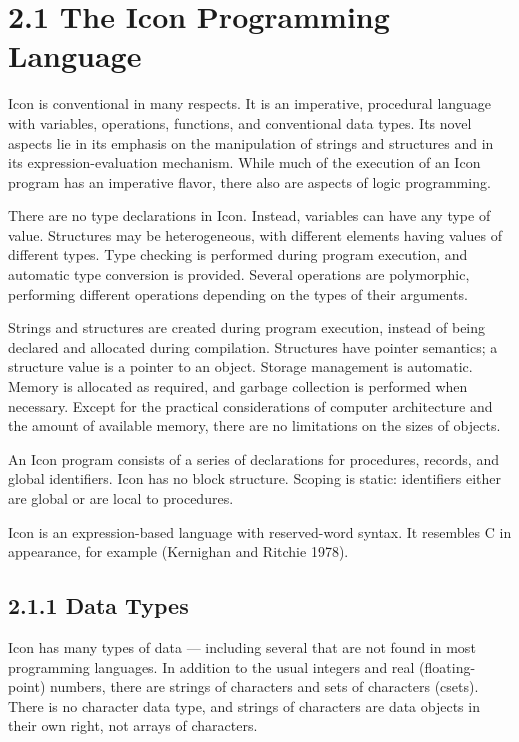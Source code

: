 \section[2.1 The Icon Programming Language]{2.1 The Icon Programming Language}

Icon is conventional in many respects. It is an imperative, procedural
language with variables, operations, functions, and conventional data
types. Its novel aspects lie in its emphasis on the manipulation of
strings and structures and in its expression-evaluation
mechanism. While much of the execution of an Icon program has an
imperative flavor, there also are aspects of logic programming.

There are no type declarations in Icon. Instead, variables can have
any type of value. Structures may be heterogeneous, with different
elements having values of different types. Type checking is performed
during program execution, and automatic type conversion is
provided. Several operations are polymorphic, performing different
operations depending on the types of their arguments.

Strings and structures are created during program execution, instead
of being declared and allocated during compilation.  Structures have
pointer semantics; a structure value is a pointer to an object.
Storage management is automatic. Memory is allocated as required, and
garbage collection is performed when necessary. Except for the
practical considerations of computer architecture and the amount of
available memory, there are no limitations on the sizes of objects.

An Icon program consists of a series of declarations for procedures,
records, and global identifiers. Icon has no block structure. Scoping
is static: identifiers either are global or are local to procedures.

Icon is an expression-based language with reserved-word syntax. It
resembles C in appearance, for example (Kernighan and Ritchie 1978).

\subsection[2.1.1 Data Types]{2.1.1 Data Types}

Icon has many types of data --- including several that are not found in
most programming languages. In addition to the usual integers and real
(floating-point) numbers, there are strings of characters and sets of
characters (csets). There is no character data type, and strings of
characters are data objects in their own right, not arrays of
characters.

